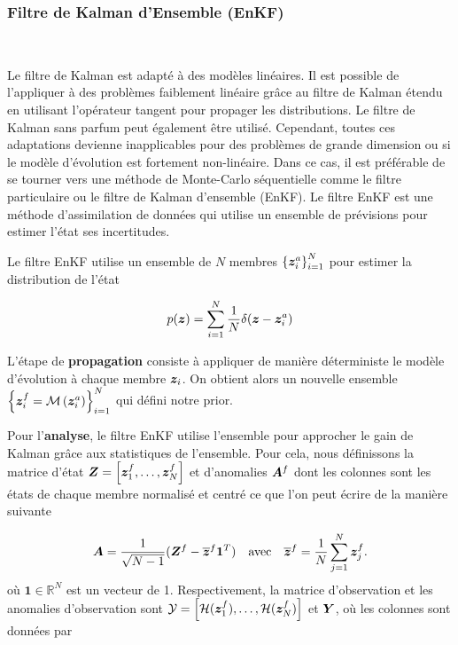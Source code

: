 \subsubsection{Filtre de Kalman d'Ensemble (EnKF)}~\label{sec:enkf}

Le filtre de Kalman est adapté à des modèles linéaires. Il est possible de l'appliquer à des problèmes faiblement linéaire grâce au filtre de Kalman étendu en utilisant l'opérateur tangent pour propager les distributions. Le filtre de Kalman sans parfum peut également être utilisé. Cependant, toutes ces adaptations devienne inapplicables pour des problèmes de grande dimension ou si le modèle d'évolution est fortement non-linéaire. Dans ce cas, il est préférable de se tourner vers une méthode de Monte-Carlo séquentielle comme le filtre particulaire ou le filtre de Kalman d'ensemble (EnKF).
Le filtre EnKF est une méthode d'assimilation de données qui utilise un ensemble de prévisions pour estimer l'état ses incertitudes.

Le filtre EnKF utilise un ensemble de $N$ membres $\left\{\bm {\bm{z}}^a_i \right\}_{i=1}^N$ pour estimer la distribution de l'état

\begin{equation*}
    p(\bm{z}) = \sum_{i=1}^{N} \frac{1}{N} \delta(\bm z - \bm z^a_i)
\end{equation*}

L'étape de \textbf{propagation} consiste à appliquer de manière déterministe le modèle d'évolution à chaque membre $\bm z_i$. On obtient alors un nouvelle ensemble $\left\{\bm {\bm{z}}^f_{i}= \mathcal M\left(\bm z_i^a\right) \right\}_{i=1}^N$ qui défini notre prior.

Pour l'\textbf{analyse}, le filtre EnKF utilise l'ensemble pour approcher le gain de Kalman grâce aux statistiques de l'ensemble. Pour cela, nous définissons la matrice d'état $\bm{Z} = \left[\bm{z}^f_1, \dots, \bm{z}^f_N\right]$ et d’anomalies $\bm A^f$ dont les colonnes sont les états de chaque membre normalisé et centré ce que l'on peut écrire de la manière suivante

\begin{equation*}
    \bm A = \frac{1}{\sqrt{N - 1}}(\bm Z^f - \overline{\bm{z}}^f \bm{1}^T) \quad \text{avec} \quad \overline{\bm{z}}^f = \frac{1}{N} \sum_{j=1}^{N} \bm{z}_j^f.
\end{equation*}où $\bm{1} \in \mathbb{R}^N$ est un vecteur de 1. Respectivement, la matrice d'observation et les anomalies d'observation sont $\mathcal Y = \left[\mathcal{H}(\bm{z}_1^f), \dots, \mathcal{H}(\bm{z}_N^f)\right]$ et $\bm Y$, où les colonnes sont données par

